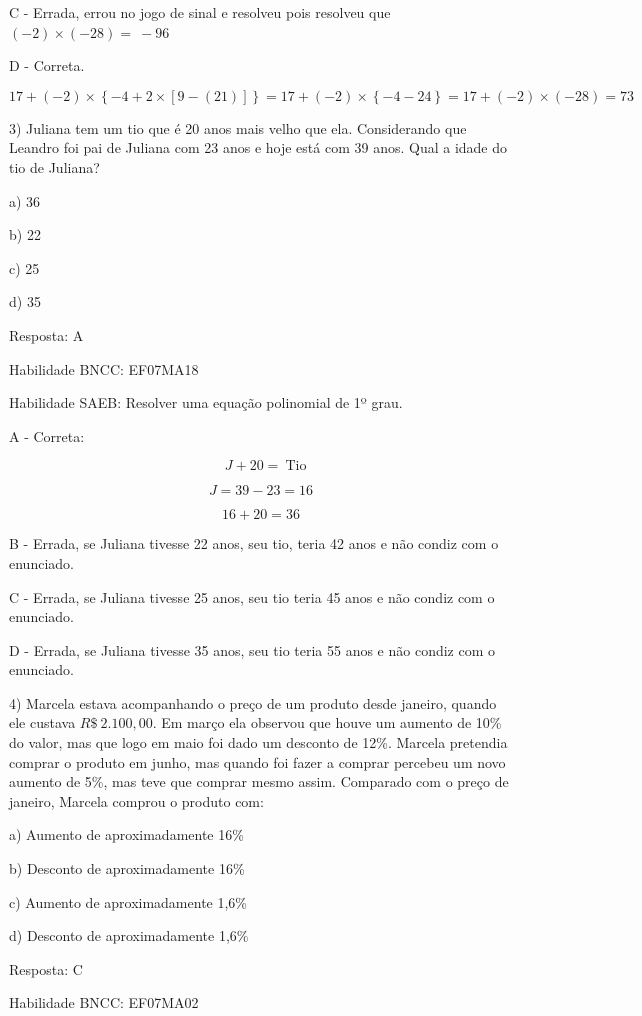 C - Errada, errou no jogo de sinal e resolveu pois resolveu que
\(( - 2) \times \left( - 28 \right) = \  - 96\)

D - Correta.

\[17 + ( - 2) \times \left\{ - 4 + 2 \times \left\lbrack 9 - \left( 21 \right) \right\rbrack \right\} = 17 + ( - 2) \times \left\{ - 4 - 24 \right\} = 17 + ( - 2) \times \left( - 28 \right) = 73\]

3) Juliana tem um tio que é 20 anos mais velho que ela. Considerando que
Leandro foi pai de Juliana com 23 anos e hoje está com 39 anos. Qual a
idade do tio de Juliana?

a) 36

b) 22

c) 25

d) 35

Resposta: A

Habilidade BNCC: EF07MA18

Habilidade SAEB: Resolver uma equação polinomial de 1º grau.

A - Correta:

\[\text{\ \ \ \ \ \ \ }J + 20 = \ \text{Tio}\]

\[J = 39 - 23 = 16\]

\[16 + 20 = 36\]

B - Errada, se Juliana tivesse 22 anos, seu tio, teria 42 anos e não
condiz com o enunciado.

C - Errada, se Juliana tivesse 25 anos, seu tio teria 45 anos e não
condiz com o enunciado.

D - Errada, se Juliana tivesse 35 anos, seu tio teria 55 anos e não
condiz com o enunciado.

4) Marcela estava acompanhando o preço de um produto desde janeiro,
quando ele custava \(R\$\ 2.100,00\). Em março ela observou que houve um
aumento de 10\% do valor, mas que logo em maio foi dado um desconto de
12\%. Marcela pretendia comprar o produto em junho, mas quando foi fazer
a comprar percebeu um novo aumento de 5\%, mas teve que comprar mesmo
assim. Comparado com o preço de janeiro, Marcela comprou o produto com:

a) Aumento de aproximadamente 16\%

b) Desconto de aproximadamente 16\%

c) Aumento de aproximadamente 1,6\%

d) Desconto de aproximadamente 1,6\%

Resposta: C

Habilidade BNCC: EF07MA02

